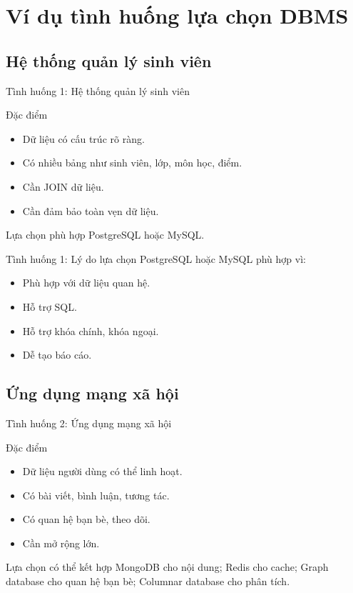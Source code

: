 \documentclass[aspectratio=169,11pt]{beamer}
\newcommand{\smallitem}{\setlength{\itemsep}{2pt}\setlength{\parskip}{0pt}}
\begin{document}
\section{Ví dụ tình huống lựa chọn DBMS}
\subsection{Hệ thống quản lý sinh viên}

\begin{frame}{Tình huống 1: Hệ thống quản lý sinh viên}
\begin{block}{Đặc điểm}
\begin{itemize}
  \smallitem
  \item Dữ liệu có cấu trúc rõ ràng.
  \item Có nhiều bảng như sinh viên, lớp, môn học, điểm.
  \item Cần JOIN dữ liệu.
  \item Cần đảm bảo toàn vẹn dữ liệu.
\end{itemize}
\end{block}

\begin{exampleblock}{Lựa chọn phù hợp}
PostgreSQL hoặc MySQL.
\end{exampleblock}
\end{frame}

\begin{frame}{Tình huống 1: Lý do lựa chọn}
PostgreSQL hoặc MySQL phù hợp vì:
\begin{itemize}
  \smallitem
  \item Phù hợp với dữ liệu quan hệ.
  \item Hỗ trợ SQL.
  \item Hỗ trợ khóa chính, khóa ngoại.
  \item Dễ tạo báo cáo.
\end{itemize}
\end{frame}

\subsection{Ứng dụng mạng xã hội}
\begin{frame}{Tình huống 2: Ứng dụng mạng xã hội}
\begin{block}{Đặc điểm}
\begin{itemize}
  \smallitem
  \item Dữ liệu người dùng có thể linh hoạt.
  \item Có bài viết, bình luận, tương tác.
  \item Có quan hệ bạn bè, theo dõi.
  \item Cần mở rộng lớn.
\end{itemize}
\end{block}

\begin{exampleblock}{Lựa chọn có thể kết hợp}
MongoDB cho nội dung; Redis cho cache; Graph database cho quan hệ bạn bè; Columnar database cho phân tích.
\end{exampleblock}
\end{frame}
\end{document}
